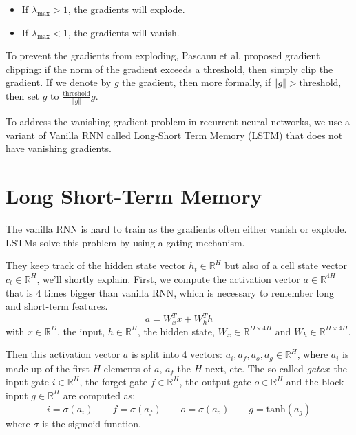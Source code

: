\begin{itemize}
    \item If $\lambda_{\text{max}} > 1$, the gradients will explode.
    \item If $\lambda_{\text{max}} < 1$, the gradients will vanish.
\end{itemize}

To prevent the gradients from exploding, Pascanu et al. proposed gradient clipping: if the norm of the gradient exceeds a threshold, then simply clip the gradient. If we denote by $g$ the gradient, then more formally, if $\Vert g \Vert > \text{threshold}$, then set $g$ to $\frac{\text{threshold}}{\Vert g \Vert} g$.

To address the vanishing gradient problem in recurrent neural networks, we use a variant of Vanilla RNN called Long-Short Term Memory (LSTM) \cite{lstm} that does not have vanishing gradients.

\section{Long Short-Term Memory}
The vanilla RNN is hard to train as the gradients often either vanish or explode. LSTMs solve this problem by using a gating mechanism. 

They keep track of the hidden state vector $h_t \in \mathbb{R}^H$ but also of a cell state vector $c_t\in \mathbb{R}^H$, we'll shortly explain. First, we compute the activation vector $a \in \mathbb{R}^{4H}$ that is 4 times bigger than vanilla RNN, which is necessary to remember long and short-term features. 
\begin{equation}
a = W_x^T x + W_h^T h
\end{equation}
with $x \in \mathbb{R}^{D}$, the input, $h \in \mathbb{R}^{H}$, the hidden state, $W_x \in \mathbb{R}^{D\times 4H}$ and $W_h \in \mathbb{R}^{H\times 4H}$.

Then this activation vector $a$ is split into 4 vectors: $a_i, a_f, a_o, a_g \in \mathbb{R}^H$, where $a_i$ is made up of the first $H$ elements of $a$, $a_f$ the $H$ next, etc. The so-called {\em gates}: the input gate $i \in \mathbb{R}^H$, the forget gate $f \in \mathbb{R}^H$, the output gate $o \in \mathbb{R}^H$ and the block input $g \in \mathbb{R}^H$ are computed as: 
\begin{equation}
    i = \sigma(a_i) \qquad f = \sigma(a_f) \qquad o = \sigma(a_o) \qquad g = \text{tanh}(a_g)
\end{equation}
where $\sigma$ is the sigmoid function.

